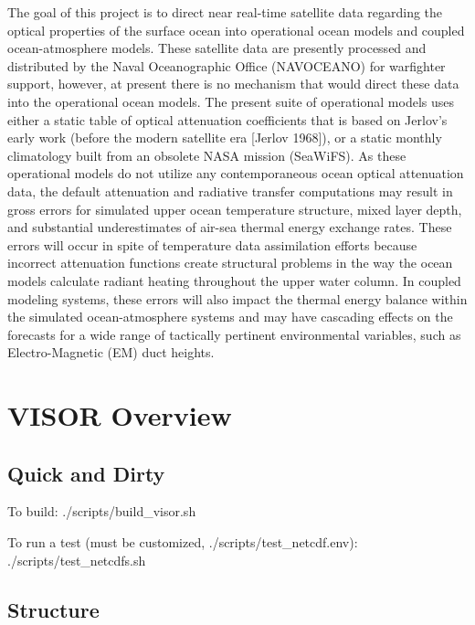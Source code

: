 The goal of this project is to direct near real-\/time satellite data regarding the optical properties of the surface ocean into operational ocean models and coupled ocean-\/atmosphere models. These satellite data are presently processed and distributed by the Naval Oceanographic Office (N\-A\-V\-O\-C\-E\-A\-N\-O) for warfighter support, however, at present there is no mechanism that would direct these data into the operational ocean models. The present suite of operational models uses either a static table of optical attenuation coefficients that is based on Jerlov’s early work (before the modern satellite era \mbox{[}Jerlov 1968\mbox{]}), or a static monthly climatology built from an obsolete N\-A\-S\-A mission (Sea\-Wi\-F\-S). As these operational models do not utilize any contemporaneous ocean optical attenuation data, the default attenuation and radiative transfer computations may result in gross errors for simulated upper ocean temperature structure, mixed layer depth, and substantial underestimates of air-\/sea thermal energy exchange rates. These errors will occur in spite of temperature data assimilation efforts because incorrect attenuation functions create structural problems in the way the ocean models calculate radiant heating throughout the upper water column. In coupled modeling systems, these errors will also impact the thermal energy balance within the simulated ocean-\/atmosphere systems and may have cascading effects on the forecasts for a wide range of tactically pertinent environmental variables, such as Electro-\/\-Magnetic (E\-M) duct heights. \hypertarget{index_my-intro}{}\section{V\-I\-S\-O\-R Overview}\label{index_my-intro}
\subsection*{Quick and Dirty}


\begin{DoxyItemize}
\item To build\-: ./scripts/build\-\_\-visor.sh
\item To run a test (must be customized, ./scripts/test\-\_\-netcdf.env)\-: ./scripts/test\-\_\-netcdfs.sh
\end{DoxyItemize}

\subsection*{Structure}


